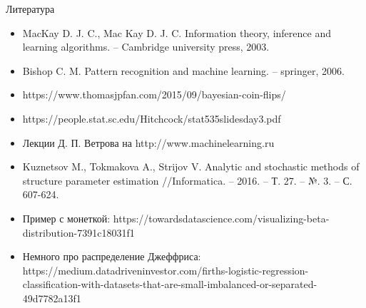 \documentclass[9pt,pdf,utf8,hyperref={unicode},aspectratio=169]{beamer}
\begin{document}
\begin{frame}{Литература}
\begin{itemize}
\item MacKay D. J. C., Mac Kay D. J. C. Information theory, inference and learning algorithms. – Cambridge university press, 2003.
\item Bishop C. M. Pattern recognition and machine learning. – springer, 2006.
\item https://www.thomasjpfan.com/2015/09/bayesian-coin-flips/
\item https://people.stat.sc.edu/Hitchcock/stat535slidesday3.pdf
\item Лекции Д. П. Ветрова на http://www.machinelearning.ru
\item Kuznetsov M., Tokmakova A., Strijov V. Analytic and stochastic methods of structure parameter estimation //Informatica. – 2016. – Т. 27. – №. 3. – С. 607-624.
\item Пример с монеткой: https://towardsdatascience.com/visualizing-beta-distribution-7391c18031f1
\item Немного про распределение Джеффриса: https://medium.datadriveninvestor.com/firths-logistic-regression-classification-with-datasets-that-are-small-imbalanced-or-separated-49d7782a13f1
\end{itemize}
\end{frame}
\end{document}
